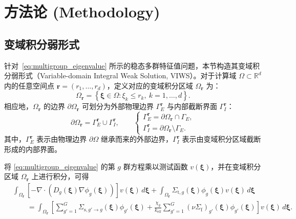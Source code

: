 \documentclass[final,3p,times,sort&compress]{elsarticle}
\begin{document}
\section{方法论 (Methodology)}
\label{sec:methodology}
\subsection{变域积分弱形式}
\label{subsec:viws_weak_form}

针对~\cref{eq:multigroup_eigenvalue} 所示的稳态多群特征值问题，本节构造其变域积分弱形式（Variable-domain Integral Weak Solution, VIWS）\cite{LiuDong2025MianXiangShen}。对于计算域 $\Omega \subset \mathbb{R}^d$ 内的任意空间点 $\boldsymbol{r} = (r_1, \ldots, r_d)$，定义对应的变域积分区域 $\Omega_{\boldsymbol{r}}$ 为：
\begin{equation}
    \Omega_{\boldsymbol{r}}
    =
    \left\{
    \boldsymbol \xi \in \Omega :
    \xi_k \leq r_k,\ k=1,\ldots,d
    \right\}.
    \label{eq:multigroup_variable_domain}
\end{equation}
相应地，$\Omega_{\boldsymbol{r}}$ 的边界 $\partial \Omega_{\boldsymbol{r}}$ 可划分为外部物理边界 $\Gamma_E^{\boldsymbol{r}}$ 与内部截断界面 $\Gamma_I^{\boldsymbol{r}}$：
\begin{equation}
\partial \Omega_{\boldsymbol{r}} = \Gamma_E^{\boldsymbol r} \cup \Gamma_I^{\boldsymbol r},
\qquad
\left\{
\begin{array}{l}
\Gamma_E^{\boldsymbol r} = \partial \Omega_{\boldsymbol r} \cap \Gamma_E, \\
\Gamma_I^{\boldsymbol r} = \partial \Omega_{\boldsymbol r} \setminus \Gamma_E.
\end{array}\right.
\label{eq:multigroup_boundary_decomposition}
\end{equation}
其中，$\Gamma_E^{\boldsymbol r}$ 表示由物理边界 $\partial\Omega$ 继承而来的外部边界，$\Gamma_I^{\boldsymbol r}$ 表示由变域积分区域截断形成的内部界面。

将 \cref{eq:multigroup_eigenvalue} 的第 $g$ 群方程乘以测试函数 $v(\boldsymbol \xi)$，并在变域积分区域 $\Omega_{\boldsymbol r}$ 上进行积分，可得
\begin{equation}
\begin{aligned}
    & \int_{\Omega_{\boldsymbol r}}
    \left[
    -\nabla \cdot
    \left(
    D_g(\boldsymbol \xi)\nabla \phi_g(\boldsymbol \xi)
    \right)
    \right]
    v(\boldsymbol \xi)\,d\boldsymbol \xi
    +
    \int_{\Omega_{\boldsymbol r}}
    \Sigma_{\mathrm{t},g}(\boldsymbol \xi)
    \phi_g(\boldsymbol \xi)
    v(\boldsymbol \xi)\,d\boldsymbol \xi
    \\
    & \qquad =
    \int_{\Omega_{\boldsymbol r}}
    \left[
    \sum_{g'=1}^{G}
    \Sigma_{\mathrm{s},g'\to g}(\boldsymbol \xi)
    \phi_{g'}(\boldsymbol \xi)
    +
    \frac{\chi_g}{k_{\mathrm{eff}}}
    \sum_{g'=1}^{G}
    \left(\nu\Sigma_{\mathrm{f}}\right)_{g'}(\boldsymbol \xi)
    \phi_{g'}(\boldsymbol \xi)
    \right]
    v(\boldsymbol \xi)\,d\boldsymbol \xi .
\end{aligned}
\label{eq:multigroup_variable_integral}
\end{equation}
\end{document}
